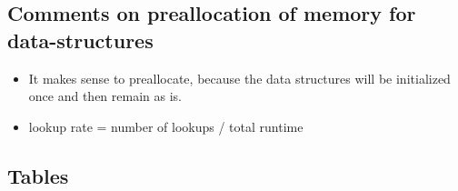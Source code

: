 \documentclass{article}
\begin{document}
\subsection{Comments on preallocation of memory for data-structures}
\begin{itemize}
    \item It makes sense to preallocate, because the data
    structures will be initialized once and then remain as is.
    \item lookup rate = number of lookups / total runtime
\end{itemize}

\newpage
\subsection{Tables}
\end{document}
